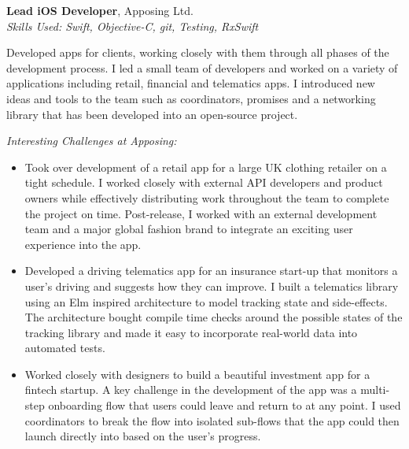 \textbf{Lead iOS Developer}, Apposing Ltd. \\
\textit{Skills Used: Swift, Objective-C, git, Testing, RxSwift}

Developed apps for clients, working closely with them through all phases of the
development process. I led a small team of developers and worked on a variety of
applications including retail, financial and telematics apps. I introduced new
ideas and tools to the team such as coordinators, promises and a networking
library that has been developed into an open-source project.

\newpage %

\textit{Interesting Challenges at Apposing:}

\smallskip

\begin{itemize}
\item Took over development of a retail app for a large UK clothing retailer on
  a tight schedule. I worked closely with external API developers and product
  owners while effectively distributing work throughout the team to complete the
  project on time. Post-release, I worked with an external development team and
  a major global fashion brand to integrate an exciting user experience into the
  app.

\item Developed a driving telematics app for an insurance start-up that monitors
  a user's driving and suggests how they can improve. I built a telematics
  library using an Elm inspired architecture to model tracking state and
  side-effects. The architecture bought compile time checks around the possible
  states of the tracking library and made it easy to incorporate real-world data
  into automated tests.

\item Worked closely with designers to build a beautiful investment app for a
  fintech startup. A key challenge in the development of the app was a
  multi-step onboarding flow that users could leave and return to at any
  point. I used coordinators to break the flow into isolated sub-flows that the
  app could then launch directly into based on the user's progress.

\end{itemize}

